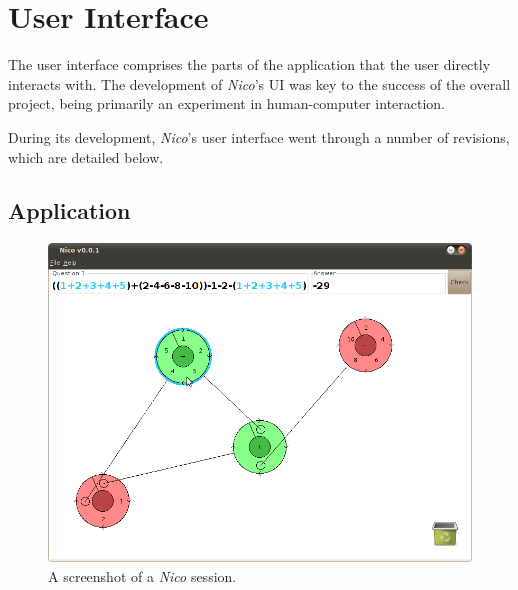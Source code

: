 \documentclass[12pt,twoside,notitlepage,xetex]{report}
\begin{document}
\section{User Interface}%

The user interface comprises the parts of the application that the user directly interacts with.  The development of \emph{Nico}'s UI was key to the success of the overall project, being primarily an experiment in human-computer interaction.

During its development, \emph{Nico}'s user interface went through a number of revisions, which are detailed below.

\subsection{Application}

\begin{center}
\begin{figure}[H]
\begin{center}
\includegraphics[width=\textwidth]{figs/nico_screen_01.png}
\end{center}
\caption{A screenshot of a \emph{Nico} session.}
\label{fig:Nico1}
\end{figure}
\end{center}
\end{document}
